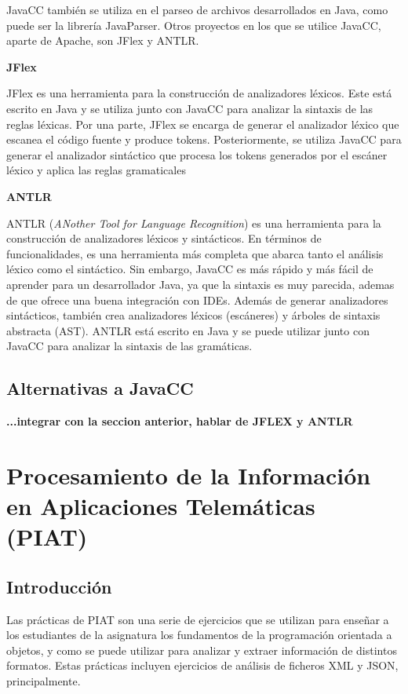 JavaCC también se utiliza en el parseo de archivos desarrollados en Java, como puede ser la librería JavaParser\cite{javaparser}. Otros proyectos en los que se utilice JavaCC, aparte de Apache, son JFlex y ANTLR.

\phantom{text}

\noindent \textbf{JFlex}

\phantom{text}

\noindent JFlex es una herramienta para la construcción de analizadores léxicos. Este está escrito en Java y se utiliza junto con JavaCC para analizar la sintaxis de las reglas léxicas. Por una parte, JFlex se encarga de generar el analizador léxico que escanea el código fuente y produce tokens. Posteriormente, se utiliza JavaCC para generar el analizador sintáctico que procesa los tokens generados por el escáner léxico y aplica las reglas gramaticales

\phantom{text}

\noindent \textbf{ANTLR}

\phantom{text}

\noindent ANTLR (\textit{ANother Tool for Language Recognition}) es una herramienta para la construcción de analizadores léxicos y sintácticos. En términos de funcionalidades, es una herramienta más completa que abarca tanto el análisis léxico como el sintáctico. Sin embargo, JavaCC es más rápido y más fácil de aprender para un desarrollador Java, ya que la sintaxis es muy parecida, ademas de que ofrece una buena integración con IDEs\cite{antlr}. Además de generar analizadores sintácticos, también crea analizadores léxicos (escáneres) y árboles de sintaxis abstracta (AST).
ANTLR está escrito en Java y se puede utilizar junto con JavaCC para analizar la sintaxis de las gramáticas.

\subsection{Alternativas a JavaCC}

\textbf{...integrar con la seccion anterior, hablar de JFLEX y ANTLR}

\section{Procesamiento de la Información en Aplicaciones Telemáticas (PIAT)}
\subsection{Introducción}
\noindent Las prácticas de PIAT son una serie de ejercicios que se utilizan para enseñar a los estudiantes de la asignatura los fundamentos de la programación orientada a objetos, y como se puede utilizar para analizar y extraer información de distintos formatos. Estas prácticas incluyen ejercicios de análisis de ficheros XML y JSON, principalmente.

